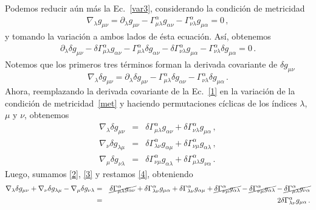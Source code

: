 \documentclass[../Main.tex]{subfiles}
\begin{document}
Podemos reducir aún más la Ec.~\eqref{var3}, considerando la condición de metricidad
\begin{align}
\nabla_{\lambda}g_{\mu\nu}=
    \partial_{\lambda}g_{\mu\nu}-\Gamma^{\alpha}_{\mu\lambda}g_{\alpha\nu}-\Gamma^{\alpha}_{\nu\lambda}g_{\mu\alpha}=0\, , \label{met}
\end{align}
y tomando la variación a ambos lados de ésta ecuación. Así, obtenemos
\begin{eqnarray}
    \partial_{\lambda}\delta g_{\mu\nu}-\delta\Gamma^{\alpha}_{\mu\lambda}g_{\alpha\nu}-\Gamma^{\alpha}_{\mu\lambda}\delta g_{\alpha\nu}-\delta\Gamma^{\alpha}_{\nu\lambda}g_{\mu\alpha}-\Gamma^{\alpha}_{\nu\lambda}\delta g_{\mu\alpha}=0 \, .
\end{eqnarray}
Notemos que los primeros tres términos forman la derivada covariante de $\delta g_{\mu\nu}$
\begin{equation}
    \nabla_{\lambda}\delta g_{\mu\nu}=\partial_{\lambda}\delta g_{\mu\nu}-\Gamma^{\alpha}_{\mu\lambda}\delta g_{\alpha\nu}-\Gamma^{\alpha}_{\nu\lambda}\delta g_{\mu\alpha}\label{1} \, .
\end{equation}
Ahora, reemplazando la derivada covariante de la Ec.~\eqref{1} en la variación de la condición de metricidad~\eqref{met} y haciendo permutaciones cíclicas de los índices $\lambda$, $\mu$ y $\nu$, obtenemos
\begin{eqnarray} \label{2}
    \nabla_{\lambda}\delta g_{\mu\nu}&=&\delta\Gamma^{\alpha}_{\mu\lambda}g_{\alpha\nu}+\delta\Gamma^{\alpha}_{\nu\lambda}g_{\mu\alpha} \, ,\\
    \nabla_{\nu}\delta g_{\lambda\mu}&=&\delta\Gamma^{\alpha}_{\lambda\nu}g_{\alpha\mu}+\delta\Gamma^{\alpha}_{\nu\mu}g_{\alpha\lambda}\label{3}\, ,\\ 
    \nabla_{\mu}\delta g_{\nu\lambda}&=&\delta\Gamma^{\alpha}_{\nu\mu}g_{\alpha\lambda}+\delta\Gamma^{\alpha}_{\mu\lambda}g_{\nu\alpha}\label{4} \, .
\end{eqnarray}
Luego, sumamos \eqref{2}, \eqref{3} y restamos \eqref{4}, obteniendo
\begin{eqnarray*}
    \nabla_{\lambda}\delta g_{\mu\nu}+\nabla_{\nu}\delta g_{\lambda\mu}-\nabla_{\mu}\delta g_{\nu\lambda}&=&\cancel{\delta\Gamma^{\alpha}_{\mu\lambda}g_{\alpha\nu}}+\delta\Gamma^{\alpha}_{\lambda\nu}g_{\mu\alpha}+\delta\Gamma^{\alpha}_{\lambda\nu}g_{\alpha\mu}+\cancel{\delta\Gamma^{\alpha}_{\nu\mu}g_{\alpha\lambda}}-\cancel{\delta\Gamma^{\alpha}_{\nu\mu}g_{\alpha\lambda}}-\cancel{\delta\Gamma^{\alpha}_{\mu\lambda}g_{\nu\alpha}}\\
&=&2\delta\Gamma^{\alpha}_{\lambda\nu}g_{\mu\alpha} \, .
\end{eqnarray*}
\end{document}
